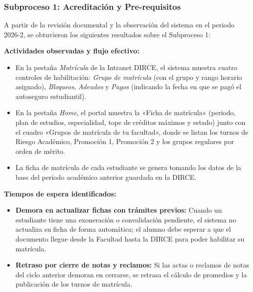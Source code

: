 \subsubsection{Subproceso 1: Acreditación y Pre-requisitos}

A partir de la revisión documental y la observación del sistema en el periodo 2026-2, se obtuvieron los siguientes resultados sobre el Subproceso 1:

\textbf{Actividades observadas y flujo efectivo:}
\begin{itemize}
    \item En la pestaña \textit{Matrícula} de la Intranet DIRCE, el sistema muestra cuatro controles de habilitación: \textit{Grupo de matrícula} (con el grupo y rango horario asignado), \textit{Bloqueos}, \textit{Adeudos} y \textit{Pagos} (indicando la fecha en que se pagó el autoseguro estudiantil). %
    \item En la pestaña \textit{Home}, el portal muestra la «Ficha de matrícula» (periodo, plan de estudios, especialidad, tope de créditos máximos y estado) junto con el cuadro «Grupos de matrícula de tu facultad», donde se listan los turnos de Riesgo Académico, Promoción 1, Promoción 2 y los grupos regulares por orden de mérito. %
    \item La ficha de matrícula de cada estudiante se genera tomando los datos de la base del periodo académico anterior guardada en la DIRCE.
\end{itemize}

\textbf{Tiempos de espera identificados:}
\begin{itemize}
    \item \textbf{Demora en actualizar fichas con trámites previos:} Cuando un estudiante tiene una exoneración o convalidación pendiente, el sistema no actualiza su ficha de forma automática; el alumno debe esperar a que el documento llegue desde la Facultad hasta la DIRCE para poder habilitar su matrícula.
    \item \textbf{Retraso por cierre de notas y reclamos:} Si las actas o reclamos de notas del ciclo anterior demoran en cerrarse, se retrasa el cálculo de promedios y la publicación de los turnos de matrícula.
\end{itemize}

